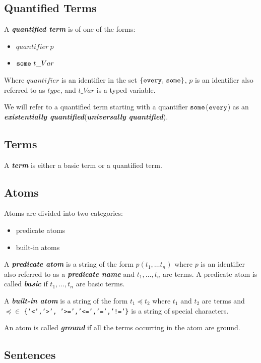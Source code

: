 \documentclass[a4paper,10pt]{article}
\begin{document}
\subsection{Quantified Terms}

A \textit{\textbf{quantified term}} is of one of the forms:
\begin{itemize}
\item $ quantifier~p $
\item $ \mbox{\texttt{some}}~t\_Var$
\end{itemize} 


Where $quantifier$ is an identifier in the set $\{\mbox{\texttt{every}, \texttt{some}}\}$, $p$ is an identifier also referred to as $type$,  and $t\_Var$ is a typed variable.

We will refer to a quantified term starting with a quantifier $\mbox{\texttt{some}}$($\mbox{\texttt{every}}$) as an \textbf{\textit{existentially quantified}}(\textbf{\textit{universally quantified}}).  


\subsection{Terms}
A \textit{\textbf{term}} is either a basic term or a quantified term.
\subsection{Atoms}

Atoms are divided into two categories:
\begin{itemize}
\item predicate atoms
\item built-in atoms
\end{itemize}

A \textit{\textbf{predicate atom}} is a string of the form $p(t_1,\ldots t_n)$ where 
$p$ is an identifier also referred to as a \textbf{\textit{predicate name}} and $t_1,\ldots,t_n$ are terms.
A predicate atom is called \textbf{\textit{basic}} if $t_1,\ldots,t_n$ are basic terms.

A \textit{\textbf{built-in atom}} is a string of the form $t_1 \preceq t_2$ where $t_1$ and $t_2$ are terms and $\preceq \in$ \texttt{\{'<','>', '>=','<=','=','!='\}} is a string of special characters.

An atom is called \textbf{\textit{ground}} if all the terms occurring in the atom are ground.
\subsection{Sentences}
\end{document}
